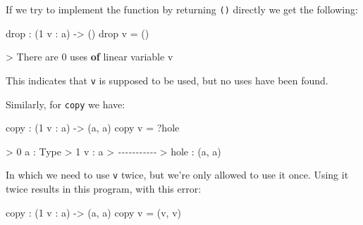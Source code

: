 \documentclass[
]{article}
\newenvironment{Shaded}{}{}
\newcommand{\CommentTok}[1]{\textcolor[rgb]{0.38,0.63,0.69}{\textit{#1}}}
\newcommand{\DataTypeTok}[1]{\textcolor[rgb]{0.56,0.13,0.00}{#1}}
\newcommand{\DecValTok}[1]{\textcolor[rgb]{0.25,0.63,0.44}{#1}}
\newcommand{\FunctionTok}[1]{\textcolor[rgb]{0.02,0.16,0.49}{#1}}
\newcommand{\KeywordTok}[1]{\textcolor[rgb]{0.00,0.44,0.13}{\textbf{#1}}}
\newcommand{\NormalTok}[1]{#1}
\newcommand{\OperatorTok}[1]{\textcolor[rgb]{0.40,0.40,0.40}{#1}}
\newcommand{\OtherTok}[1]{\textcolor[rgb]{0.00,0.44,0.13}{#1}}
\begin{document}
If we try to implement the function by returning \texttt{()} directly we
get the following:

\begin{Shaded}
\begin{Highlighting}[]
\FunctionTok{drop} \OperatorTok{:}\NormalTok{ (}\DecValTok{1}\NormalTok{ v }\OperatorTok{:}\NormalTok{ a) }\OtherTok{{-}\textgreater{}}\NormalTok{ ()}
\FunctionTok{drop}\NormalTok{ v }\OtherTok{=}\NormalTok{ ()}
\end{Highlighting}
\end{Shaded}

\begin{Shaded}
\begin{Highlighting}[]
\OperatorTok{\textgreater{}} \DataTypeTok{There}\NormalTok{ are }\DecValTok{0}\NormalTok{ uses }\KeywordTok{of}\NormalTok{ linear variable v}
\end{Highlighting}
\end{Shaded}

This indicates that \texttt{v} is supposed to be used, but no uses have
been found.

Similarly, for \texttt{copy} we have:

\begin{Shaded}
\begin{Highlighting}[]
\NormalTok{copy }\OperatorTok{:}\NormalTok{ (}\DecValTok{1}\NormalTok{ v }\OperatorTok{:}\NormalTok{ a) }\OtherTok{{-}\textgreater{}}\NormalTok{ (a, a)}
\NormalTok{copy v }\OtherTok{=} \OperatorTok{?}\NormalTok{hole}
\end{Highlighting}
\end{Shaded}

\begin{Shaded}
\begin{Highlighting}[]
\OperatorTok{\textgreater{}} \DecValTok{0}\NormalTok{ a }\OperatorTok{:} \DataTypeTok{Type}
\OperatorTok{\textgreater{}} \DecValTok{1}\NormalTok{ v }\OperatorTok{:}\NormalTok{ a}
\OperatorTok{\textgreater{}} \CommentTok{{-}{-}{-}{-}{-}{-}{-}{-}{-}{-}{-}}
\OperatorTok{\textgreater{}}\NormalTok{ hole }\OperatorTok{:}\NormalTok{ (a, a)}
\end{Highlighting}
\end{Shaded}

In which we need to use \texttt{v} twice, but we're only allowed to use
it once. Using it twice results in this program, with this error:

\begin{Shaded}
\begin{Highlighting}[]
\NormalTok{copy }\OperatorTok{:}\NormalTok{ (}\DecValTok{1}\NormalTok{ v }\OperatorTok{:}\NormalTok{ a) }\OtherTok{{-}\textgreater{}}\NormalTok{ (a, a)}
\NormalTok{copy v }\OtherTok{=}\NormalTok{ (v, v)}
\end{Highlighting}
\end{Shaded}
\end{document}
